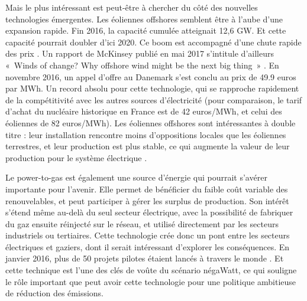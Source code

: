 Mais le plus intéressant est peut-être à chercher du côté des nouvelles technologies émergentes. 
Les éoliennes offshores semblent être à l’aube d’une expansion rapide. Fin 2016, la capacité cumulée atteignait 12,6 GW. Et cette capacité pourrait doubler d’ici 2020. Ce boom est accompagné d’une chute rapide des prix \citep[p.14]{IRENA2017a}. Un rapport de McKinsey publié en mai 2017 s’intitule d’ailleurs «~Winds of change? Why offshore wind might be the next big thing~» \citep{McKinsey2017Wind}. En novembre 2016, un appel d’offre au Danemark s’est conclu au prix de 49.9 euros par MWh. Un record absolu pour cette technologie, qui se rapproche rapidement de la compétitivité avec les autres sources d’électricité (pour comparaison, le tarif d'achat du nucléaire historique en France est de 42 euros/MWh, et celui des éoliennes de 82 euros/MWh). Les éoliennes offshores sont intéressantes à double titre : leur installation rencontre moins d’oppositions locales que les éoliennes terrestres, et leur production est plus stable, ce qui augmente la valeur de leur production pour le système électrique \citep{Hirth2016}.

Le power-to-gas est également une source d’énergie qui pourrait s’avérer importante pour l’avenir. Elle permet de bénéficier du faible coût variable des renouvelables, et peut participer à gérer les surplus de production. Son intérêt s’étend même au-delà du seul secteur électrique, avec la possibilité de fabriquer du gaz ensuite réinjecté sur le réseau, et utilisé directement par les secteurs industriels ou tertiaires. Cette technologie crée donc un pont entre les secteurs électriques et gaziers, dont il serait intéressant d’explorer les conséquences. En janvier 2016, plus de 50 projets pilotes étaient lancés à travers le monde \citep{EneaConsulting2016}. Et cette technique est l’une des clés de voûte du scénario négaWatt, ce qui souligne le rôle important que peut avoir cette technologie pour une politique ambitieuse de réduction des émissions.

